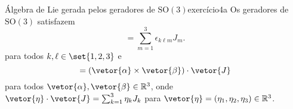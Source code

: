 \begin{proposition}{Álgebra de Lie gerada pelos geradores de \(\mathrm{SO}(3)\)}{exercício4a}
    Os geradores de \(\mathrm{SO}(3)\) satisfazem
    \begin{equation*}
        [J_k, J_\ell] = \sum_{m = 1}^3 \epsilon_{k\ell m} J_m.
    \end{equation*}
    para todos \(k, \ell \in \set{1,2,3}\) e
    \begin{equation*}
        [\vetor{\alpha} \cdot \vetor{J}, \vetor{\beta}\cdot \vetor{J}] = \left(\vetor{\alpha} \times \vetor{\beta}\right)\cdot \vetor{J}
    \end{equation*}
    para todos \(\vetor{\alpha}, \vetor{\beta} \in \mathbb{R}^3\), onde \(\vetor{\eta} \cdot \vetor{J} = \sum_{k = 1}^3 \eta_k J_k\) para \(\vetor{\eta} = (\eta_1, \eta_2, \eta_3) \in \mathbb{R}^3\).
\end{proposition}
